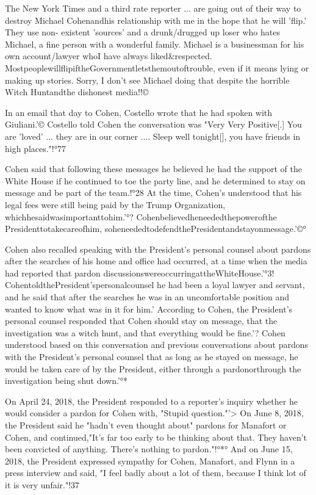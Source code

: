 The New York Times and a third rate reporter ... are going out of their way to destroy Michael Cohenandhis relationship with me in the hope that he will 'flip.'
They use non- existent 'sources' and a drunk/drugged up loser who hates Michael, a fine person with a wonderful family.
Michael is a businessman for his own account/lawyer whoI have always liked&respected.
MostpeoplewillflipiftheGovernmentletsthemoutoftrouble, even if it means lying or making up stories.
Sorry, I don't see Michael doing that despite the horrible Witch Huntandthe dishonest media!!©%

In an email that day to Cohen, Costello wrote that he had spoken with Giuliani.'© Costello told Cohen the conversation was "Very Very Positive[.] You are 'loved' ... they are in our corner .... Sleep well tonight[], you have friends in high places."!°77

Cohen said that following these messages he believed he had the support of the White House if he continued to toe the party line, and he determined to stay on message and be part of the team.!°28
At the time, Cohen's understood that his legal fees were still being paid by the Trump Organization, whichhesaidwasimportanttohim.'°?
Cohenbelievedheneededthepowerofthe Presidenttotakecareofhim, soheneededtodefendthePresidentandstayonmessage.'©°

Cohen also recalled speaking with the President's personal counsel about pardons after the searches of his home and office had occurred, at a time when the media had reported that pardon discussionswereoccurringattheWhiteHouse.'°3!
CohentoldthePresident'spersonalcounsel he had been a loyal lawyer and servant, and he said that after the searches he was in an uncomfortable position and wanted to know what was in it for him.'%
According to Cohen, the President's personal counsel responded that Cohen should stay on message, that the investigation was a witch hunt, and that everything would be fine.'?
Cohen understood based on this conversation and previous conversations about pardons with the President's personal counsel that as long as he stayed on message, he would be taken care of by the President, either through a pardonorthrough the investigation being shut down.'°*

On April 24, 2018, the President responded to a reporter's inquiry whether he would consider a pardon for Cohen with, "Stupid question."'>
On June 8, 2018, the President said he "hadn't even thought about" pardons for Manafort or Cohen, and continued,"It's far too early to be thinking about that.
They haven't been convicted of anything.
There's nothing to pardon."!°*°
And on June 15, 2018, the President expressed sympathy for Cohen, Manafort, and Flynn in a press interview and said, "I feel badly about a lot of them, because I think lot of it is very unfair."!37

